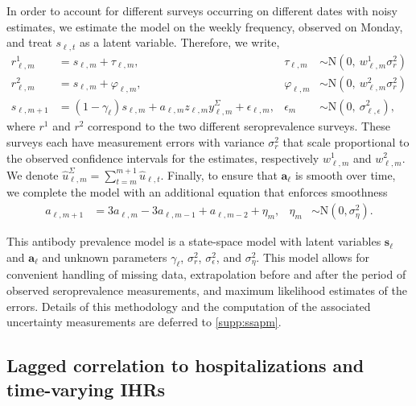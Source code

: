 In order to account for different surveys occurring on different dates with
noisy estimates, we estimate the model on the weekly frequency, observed on
Monday, and treat $s_{\ell,t}$ as a latent variable. Therefore, we write,
\begin{align}
\label{eq:waningpr}
r^1_{\ell,m} &= s_{\ell,m} + \tau_{\ell,m}, 
  & \tau_{\ell,m} &\sim \textrm{N}(0,\ w^1_{\ell,m}\sigma^2_r)\\
r^2_{\ell,m} &= s_{\ell,m} + \varphi_{\ell,m}, 
  & \varphi_{\ell,m} &\sim \textrm{N}(0,\ w^2_{\ell,m}\sigma^2_r)\\
s_{\ell,m+1} &= (1 -\gamma_{\ell}) s_{\ell,m} + 
  a_{\ell,m} z_{\ell,m} y^\Sigma_{\ell,m} + \epsilon_{\ell,m}, 
  & \epsilon_{m} &\sim \textrm{N}(0,\ \sigma^2_{\ell,\epsilon}),
\end{align}
where $r^1$ and $r^2$ correspond to the two different seroprevalence surveys.
These surveys each have measurement errors with variance $\sigma^2_r$ that scale
proportional to the observed confidence intervals for the estimates,
respectively $w^1_{\ell,m}$ and $w^2_{\ell,m}$. We denote
$\widehat{u}^\Sigma_{\ell,m} = \sum_{t=m}^{m+1} \widehat{u}_{\ell,t}$. Finally,
to ensure that $\mathbf{a}_\ell$ is smooth over time, we complete the model with
an additional equation that enforces smoothness
\begin{align}
a_{\ell,m+1} &= 3a_{\ell,m} - 3a_{\ell,m-1} + a_{\ell,m-2} + \eta_m, 
  &\eta_m  &\sim \textrm{N}(0, \sigma^2_{\eta}).
\end{align}
    
This antibody prevalence model is a state-space model with latent variables
$\mathbf{s}_{\ell}$ and $\mathbf{a}_{\ell}$ and unknown parameters $\gamma_\ell$,
$\sigma^2_r$, $\sigma^2_\epsilon$, and $\sigma^2_\eta$. This model
allows for convenient handling of missing data, extrapolation
before and after the period of observed seroprevalence measurements, and maximum
likelihood estimates of the errors. Details of this
methodology and the computation of the associated uncertainty measurements are
deferred to \autoref{supp:ssapm}.



\subsection{Lagged correlation to hospitalizations and time-varying IHRs} 
\label{sec:ihr-calculations}


